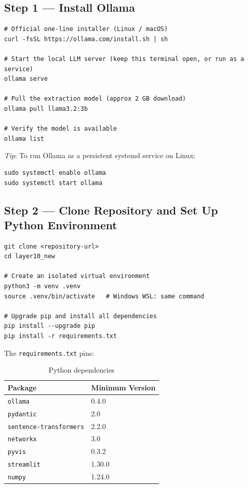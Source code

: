 \documentclass[12pt,a4paper]{article}
\begin{document}
\subsection{Step 1 — Install Ollama}

\begin{lstlisting}[style=bashstyle]
# Official one-line installer (Linux / macOS)
curl -fsSL https://ollama.com/install.sh | sh

# Start the local LLM server (keep this terminal open, or run as a service)
ollama serve

# Pull the extraction model (approx 2 GB download)
ollama pull llama3.2:3b

# Verify the model is available
ollama list
\end{lstlisting}

\textit{Tip}: To run Ollama as a persistent systemd service on Linux:
\begin{lstlisting}[style=bashstyle]
sudo systemctl enable ollama
sudo systemctl start ollama
\end{lstlisting}

\subsection{Step 2 — Clone Repository and Set Up Python Environment}

\begin{lstlisting}[style=bashstyle]
git clone <repository-url>
cd layer10_new

# Create an isolated virtual environment
python3 -m venv .venv
source .venv/bin/activate   # Windows WSL: same command

# Upgrade pip and install all dependencies
pip install --upgrade pip
pip install -r requirements.txt
\end{lstlisting}

The \texttt{requirements.txt} pins:

\begin{table}[H]
\centering
\begin{tabular}{@{}ll@{}}
\toprule
\textbf{Package} & \textbf{Minimum Version} \\ \midrule
\texttt{ollama}                & 0.4.0 \\
\texttt{pydantic}              & 2.0   \\
\texttt{sentence-transformers} & 2.2.0 \\
\texttt{networkx}              & 3.0   \\
\texttt{pyvis}                 & 0.3.2 \\
\texttt{streamlit}             & 1.30.0 \\
\texttt{numpy}                 & 1.24.0 \\
\bottomrule
\end{tabular}
\caption{Python dependencies}
\end{table}
\end{document}
